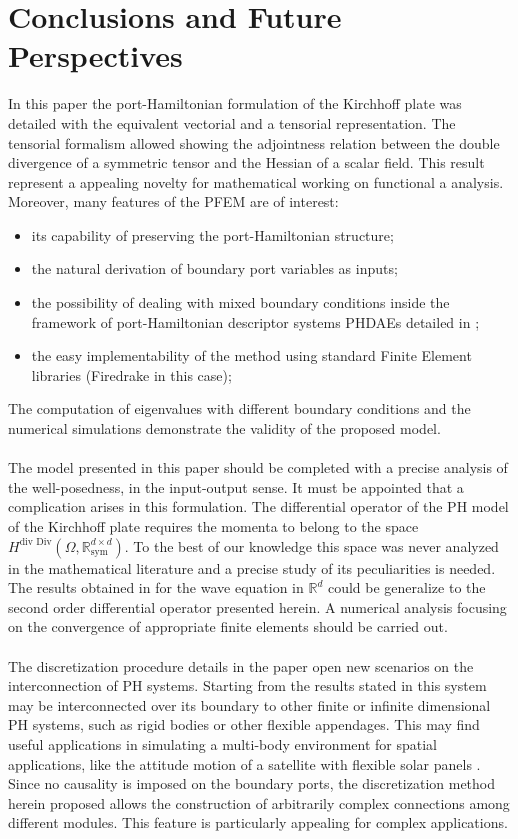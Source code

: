 \documentclass[preprint,12pt]{elsarticle}
\newcommand{\revOne}[1]{\textcolor{blue!80!black}{#1}}
\begin{document}
\section*{Conclusions and Future Perspectives}
\revOne{
In this paper the port-Hamiltonian formulation of the Kirchhoff plate was detailed with the equivalent vectorial and a tensorial representation. The tensorial formalism allowed showing the adjointness relation between the double divergence of a symmetric tensor and the Hessian of a scalar field. This result represent a appealing novelty for mathematical working on functional a analysis. Moreover, many features of the PFEM are of interest:
\begin{itemize}
	\item its capability of preserving the port-Hamiltonian structure;
	\item the natural derivation of boundary port variables as inputs;
	\item the possibility of dealing with mixed boundary conditions inside the framework of  port-Hamiltonian descriptor systems PHDAEs  detailed in \cite{beattie2018linear};
	\item the easy implementability of the method using standard Finite Element libraries (Firedrake \cite{firedrake} in this case);
\end{itemize}   
The computation of eigenvalues with different boundary conditions and the numerical simulations demonstrate the validity of the proposed model. \\ \\
The model presented in this paper should be completed with a precise analysis of the well-posedness, in the input-output sense. It must be appointed that a complication arises in this formulation. The differential operator of the PH model of the Kirchhoff plate requires the momenta to belong to the space $H^{\text{div Div}}(\Omega, \mathbb{R}^{d \times d}_{\text{sym}})$. To the best of our knowledge this space was never analyzed in the mathematical literature and a precise study of its peculiarities is needed. The results obtained in \cite{waveEqZwart} for the wave equation in $\mathbb{R}^d$ could be generalize to the second order differential operator presented herein. A numerical analysis focusing on the convergence of appropriate finite elements should be carried out. \\ \\
The discretization procedure details in the paper open new scenarios on the interconnection of PH systems. Starting from the results stated in \cite{ShaftIntInfinite} this system may be interconnected over its boundary to other finite or infinite dimensional PH systems, such as rigid bodies or other flexible appendages. This may find useful applications in simulating a multi-body environment for spatial applications, like the attitude motion of a satellite with flexible solar panels \cite{aoues:hal-01738092}. Since no causality is imposed on the boundary ports, the discretization method herein proposed allows the construction of arbitrarily complex connections among different modules. This feature is particularly appealing for complex applications.
}
 	
\end{document}
